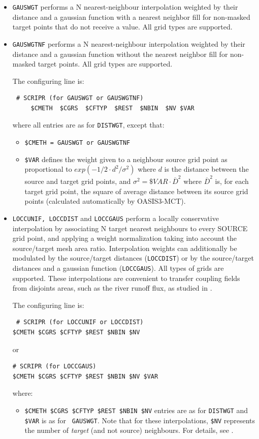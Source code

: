 \begin{itemize}
\begin{itemize}
  \item {\tt GAUSWGT} performs a N nearest-neighbour interpolation
    weighted by their distance and a gaussian function with a nearest neighbor fill for
    non-masked target points that do not receive a value. All grid types are supported.

  \item {\tt GAUSWGTNF} performs a N nearest-neighbour interpolation
    weighted by their distance and a gaussian function without the nearest neighbor fill for
    non-masked target points. All grid types are supported.

    The configuring line is:
\begin{verbatim}
 # SCRIPR (for GAUSWGT or GAUSWGTNF)
     $CMETH  $CGRS  $CFTYP  $REST  $NBIN  $NV $VAR
\end{verbatim}
    where all entries are as for {\tt DISTWGT}, except that:
    \begin{itemize}
    \item {\tt \$CMETH = GAUSWGT or GAUSWGTNF}
    \item {\tt \$VAR} defines the weight given to a neighbour source grid
      point as proportional to $exp(-1/2 \cdot d^2/\sigma^2)$ where
      $d$ is the distance between the source and target grid points,
      and $\sigma^2 = \$VAR \cdot \overline{D}^2$ where
      $\overline{D}^2$ is, for each target grid point, the square of average distance between its source grid points  
      (calculated automatically by OASIS3-MCT).
    \end{itemize}

  \item {\tt LOCCUNIF, LOCCDIST} and {\tt LOCCGAUS} perform a
    locally conservative interpolation by associating N target nearest
    neighbours to every SOURCE grid point, and applying a weight
    normalization taking into account the source/target mesh area ratio. Interpolation
    weights can additionally be modulated by the source/target
    distances ({\tt LOCCDIST}) or by the source/target
    distances and a gaussian function ({\tt LOCCGAUS}). All
    types of grids are supported. These interpolations are convenient
    to transfer coupling fields from disjoints areas, such as the
    river runoff flux, as studied in \cite{voldoire2020}.

    The configuring line is:
\begin{verbatim}
 # SCRIPR (for LOCCUNIF or LOCCDIST)
$CMETH $CGRS $CFTYP $REST $NBIN $NV
\end{verbatim}
    or
 \begin{verbatim}   
# SCRIPR (for LOCCGAUS)
$CMETH $CGRS $CFTYP $REST $NBIN $NV $VAR
\end{verbatim}
    where:
    \begin{itemize}
    \item  {\tt \$CMETH \$CGRS \$CFTYP \$REST \$NBIN \$NV} entries are
      as for {\tt DISTWGT} and  {\tt \$VAR} is as for {\tt
        GAUSWGT}. Note that for these interpolations, {\tt \$NV} represents the number of 
{\it target} (and not source) neighbours. For details, see \cite{maisonna2020}.
    \end{itemize}


\end{itemize}
\end{itemize}
